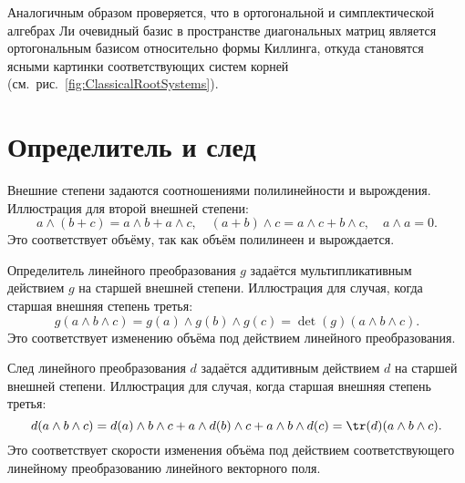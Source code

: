 \documentclass[
	extrafontsizes,
	11pt,
	hyphens,
]{memoir}
\begin{document}
Аналогичным образом проверяется, что в ортогональной и симплектической алгебрах Ли очевидный базис в пространстве диагональных матриц является ортогональным базисом относительно формы Киллинга, откуда становятся ясными картинки соответствующих систем корней (см.\ рис.~\ref{fig:ClassicalRootSystems}).


\section{Определитель и след}

\begin{observation}%
Внешние степени задаются соотношениями
полилинейности и вырождения.
Иллюстрация для второй внешней степени:
\[a \wedge (b+c) = a \wedge b + a \wedge c, \quad
(a+b) \wedge c = a \wedge c + b \wedge c, \quad
a \wedge a = 0.\]
Это соответствует объёму,
так как объём полилинеен и вырождается.
\end{observation}

\begin{observation}%
Определитель линейного преобразования \(g\)
задаётся мультипликативным действием \(g\)
на старшей внешней степени.
Иллюстрация для случая, когда старшая внешняя степень третья:
\[g(a \wedge b \wedge c) =
g(a) \wedge g(b) \wedge g(c) =
\det(g) (a \wedge b \wedge c).\]
Это соответствует изменению
объёма под действием линейного преобразования.
\end{observation}

\begin{observation}%
След линейного
преобразования
\(d\) задаётся аддитивным
действием \(d\) на старшей внешней степени.
Иллюстрация для случая, когда старшая внешняя степень третья:
\[d(a \wedge b \wedge c) =
d(a) \wedge b \wedge c +
a \wedge d(b) \wedge c +
a \wedge b \wedge d(c) = 
\tr(d) (a \wedge b \wedge c).\]
Это соответствует скорости изменения
объёма под действием соответствующего линейному преобразованию линейного векторного поля.
\end{observation}
\end{document}
